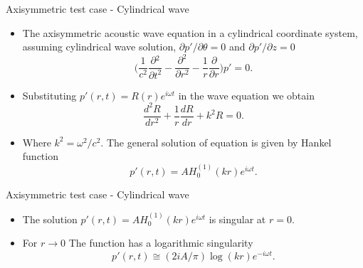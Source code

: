 \documentclass[10pt, aspectratio=169]{beamer}
\begin{document}
\begin{frame}{Axisymmetric test case - Cylindrical wave}
	\begin{itemize}
		\item The axisymmetric acoustic wave equation in a cylindrical coordinate system, assuming cylindrical wave solution, $\partial p'/\partial \theta = 0$ and $\partial p'/\partial z = 0$
		\begin{equation}\label{Cylindrical wave equation}
			\Bigg( \frac{1}{c^2}\frac{\partial{}^{2}}{\partial{t}^{2}}- \frac{\partial^2}{\partial r^2} - \frac{1}{r}\frac{\partial}{\partial r}  \Bigg) p' = 0.
		\end{equation}
		\item Substituting $p'(r, t) = R(r)e^{i\omega t}$ in the wave equation we obtain
		\begin{equation}
			\frac{d^2 R}{dr^2} + \frac{1}{r}\frac{dR}{dr} + k^2R = 0.
		\end{equation}
		\item Where $k^2 = {\omega^2}/{c^2}$. The general solution of equation is given by Hankel function
		\begin{equation}
			p'(r, t) = AH_{0}^{(1)}(kr)e^{i\omega t}.
		\end{equation}
	\end{itemize}
\end{frame}

\begin{frame}{Axisymmetric test case - Cylindrical wave}
	\begin{itemize}
		\item The solution $p'(r, t) = AH_{0}^{(1)}(kr)e^{i\omega t}$ is singular at $r = 0$. 
		\item For $r \to 0 $ The function has a logarithmic singularity
		\begin{equation}
			p'(r, t) \cong (2i A/\pi)\log(k r)e^{-i\omega t}.
		\end{equation}
	\end{itemize}
\end{frame}
\end{document}
